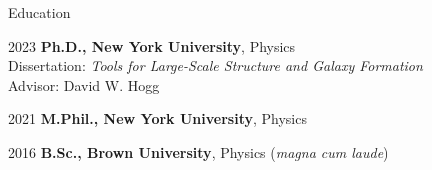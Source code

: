 \begin{cvlist}{Education}
\item[2023] \textbf{Ph.D., New York University}, Physics \\
Dissertation: \emph{Tools for Large-Scale Structure and Galaxy Formation} \\
Advisor: David W. Hogg
\item[2021] \textbf{M.Phil., New York University}, Physics
\item[2016] \textbf{B.Sc., Brown University}, Physics (\emph{magna cum laude})
\end{cvlist}